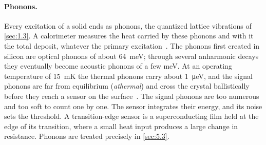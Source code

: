 \paragraph{Phonons.} Every excitation of a solid ends as phonons, the quantized lattice vibrations of \cref{sec:1.3}. A calorimeter measures the heat carried by these phonons and with it the total deposit, whatever the primary excitation~\cite[Sect.~VII\,B]{kahn2022searches}. The phonons first created in silicon are optical phonons of about \SI{64}{meV}; through several anharmonic decays they eventually become acoustic phonons of a few meV. At an operating temperature of \SI{15}{mK} the thermal phonons carry about \SI{1}{\micro eV}, and the signal phonons are far from equilibrium (\emph{athermal}) and cross the crystal ballistically before they reach a sensor on the surface~\cite[Sect.~VII\,B]{kahn2022searches}. The signal phonons are too numerous and too soft to count one by one. The sensor integrates their energy, and its noise sets the threshold. A transition-edge sensor is a superconducting film held at the edge of its transition, where a small heat input produces a large change in resistance. Phonons are treated precisely in \cref{sec:5.3}.

